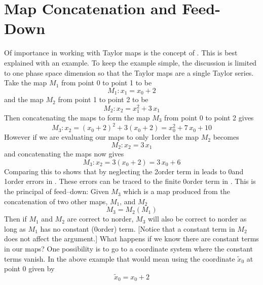 \section{Map Concatenation and Feed-Down}
\label{s:map.concat}

Of importance in working with Taylor maps is the concept of
.  This is best explained with an example. To keep the
example simple, the discussion is limited to one phase space
dimension so that the Taylor maps are a single Taylor series. Take the
map $M_1$ from point 0 to point 1 to be
\begin{equation}
  M_1: x_1 = x_0 + 2
  \label{xx2}
\end{equation}
and the map $M_2$ from point 1 to point 2 to be
\begin{equation}
  M_2: x_2 = x_1^2 + 3 \, x_1
  \label{xx3x}
\end{equation}
Then concatenating the maps to form the map $M_3$ from point 0 to point 2
gives
\begin{equation}
  M_3: x_2 = (x_0 + 2)^2 + 3 (x_0 + 2) = x_0^2 + 7 \, x_0 + 10
  \label{xx23x2}
\end{equation}
However if we are evaluating our maps to only 1\St order the map $M_2$
becomes
\begin{equation}
  M_2: x_2 = 3 \, x_1
\end{equation}
and concatenating the maps now gives
\begin{equation}
  M_3: x_2 = 3 (x_0 + 2) = 3 \, x_0 + 6
  \label{x3x23}
\end{equation}
Comparing this to  shows that by neglecting the 2\Nd order
term in  leads to 0\Th and 1\St order errors in
. These errors can be traced to the finite 0\Th order term in
. This is the principal of feed--down: Given $M_3$ which is a map
produced from the concatenation of two other maps, $M_1$, and $M_2$
\begin{equation}
  M_3 = M_2(M_1)
\end{equation}
Then if $M_1$ and $M_2$ are correct to n\Th order, $M_3$ will also be
correct to n\Th order as long as $M_1$ has no constant (0\Th order)
term. [Notice that a constant term in $M_2$ does not affect the
argument.]  What happens if we know there are constant terms in our
maps? One possibility is to go to a coordinate system where the
constant terms vanish. In the above example that would mean using the
coordinate $\widetilde x_0$ at point 0 given by
\begin{equation}
  \widetilde x_0 = x_0 + 2
\end{equation}

